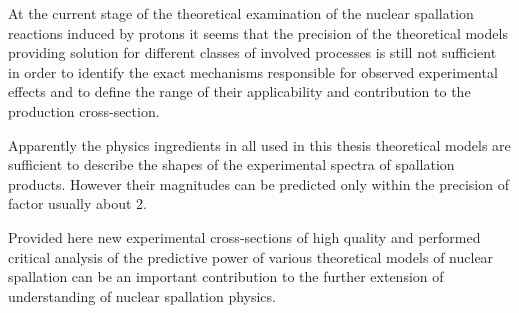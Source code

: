 At the current stage of the theoretical examination of the nuclear
spallation reactions induced by protons it seems that the precision
of the theoretical models providing solution for different classes
of involved processes is still not sufficient in order to identify
the exact mechanisms responsible for observed experimental effects
and to define the range of their applicability and contribution to
the production cross-section.

Apparently the physics ingredients in all used  in this thesis
theoretical models are sufficient to describe the shapes of the
experimental spectra of spallation products. However their
magnitudes can be predicted only within the precision of factor
usually about 2.

Provided here new experimental cross-sections of high quality and
performed critical analysis of the predictive power of various
theoretical models of nuclear spallation can be an important
contribution to the further extension of  understanding of nuclear
spallation physics.


